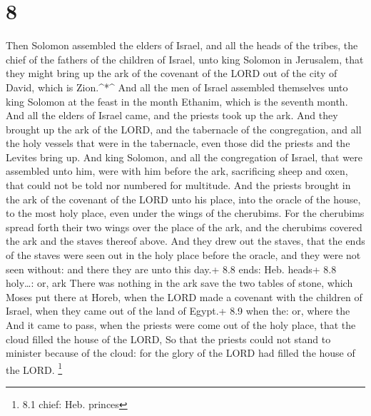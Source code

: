 \hypertarget{section-7}{%
\section{8}\label{section-7}}

 Then Solomon assembled the elders of Israel, and all the
heads of the tribes, the chief of the fathers of the children of Israel,
unto king Solomon in Jerusalem, that they might bring up the ark of the
covenant of the LORD out of the city of David, which is Zion.\^{}*\^{}
 And all the men of Israel assembled themselves unto king
Solomon at the feast in the month Ethanim, which is the seventh month.
 And all the elders of Israel came, and the priests took up
the ark.  And they brought up the ark of the LORD, and the
tabernacle of the congregation, and all the holy vessels that were in
the tabernacle, even those did the priests and the Levites bring up.
 And king Solomon, and all the congregation of Israel, that
were assembled unto him, were with him before the ark, sacrificing sheep
and oxen, that could not be told nor numbered for multitude.
 And the priests brought in the ark of the covenant of the
LORD unto his place, into the oracle of the house, to the most holy
place, even under the wings of the cherubims.  For the
cherubims spread forth their two wings over the place of the ark, and
the cherubims covered the ark and the staves thereof above. 
And they drew out the staves, that the ends of the staves were seen out
in the holy place before the oracle, and they were not seen without: and
there they are unto this day.+ 8.8 ends: Heb. heads+ 8.8 holy\ldots: or,
ark  There was nothing in the ark save the two tables of
stone, which Moses put there at Horeb, when the LORD made a covenant
with the children of Israel, when they came out of the land of Egypt.+
8.9 when the: or, where the  And it came to pass, when the
priests were come out of the holy place, that the cloud filled the house
of the LORD,  So that the priests could not stand to
minister because of the cloud: for the glory of the LORD had filled the
house of the LORD. \footnote{8.1 chief: Heb. princes}

